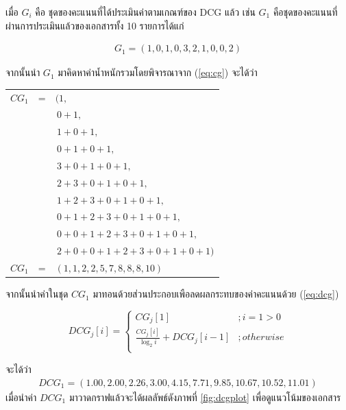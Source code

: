 \documentclass[11pt,a4paper]{article}
\begin{document}
{{{เมื่อ $G_i$ คือ ชุดของคะแนนที่ได้ประเมินค่าตามเกณฑ์ของ DCG แล้ว เช่น $G_1$ คือชุดของคะแนนที่ผ่านการประเมินแล้วของเอกสารทั้ง 10 รายการได้แก่ 

\begin{align*}
    G_1 = (1, 0, 1, 0, 3, 2, 1, 0, 0, 2)
\end{align*}

จากนั้นนำ $G_1$ มาคิดหาค่าน้ำหนักรวมโดยพิจารณาจาก (\ref{eq:cg}) จะได้ว่า

\begin{table}[ht!]
    \centering
    \begin{tabular}{rcl} 
        $CG_1$  &=&$(1,$                                      \\
                & &$\,0 + 1,$                                 \\
                & &$\,1 + 0 + 1,$                             \\
                & &$\,0 + 1 + 0 + 1,$                         \\
                & &$\,3 + 0 + 1 + 0 + 1,$                     \\
                & &$\,2 + 3 + 0 + 1 + 0 + 1,$                 \\
                & &$\,1 + 2 + 3 + 0 + 1 + 0 + 1,$             \\
                & &$\,0 + 1 + 2 + 3 + 0 + 1 + 0 + 1,$         \\
                & &$\,0 + 0 + 1 + 2 + 3 + 0 + 1 + 0 + 1,$     \\
                & &$\,2 + 0 + 0 + 1 + 2 + 3 + 0 + 1 + 0 + 1)$ \\
        $CG_1$  &=&$(1, 1, 2, 2, 5, 7, 8, 8, 8, 10)$
    \end{tabular}
\end{table}

จากนั้นนำค่าในชุด $CG_1$ มาทอนด้วยส่วนประกอบเพือลดผลกระทบของค่าคะแนนด้วย (\ref{eq:dcg})

\begin{equation}
    DCG_j[i] = 
    \begin{cases}
        CG_j[1]                                 &; i = 1 > 0 \\
        \frac{CG_j[i]}{\log_2i} + DCG_j[i-1]    &; otherwise \\
    \end{cases}
    \label{eq:dcg}
\end{equation}

จะได้ว่า
\begin{align*}
    DCG_1 = (1.00, 2.00, 2.26, 3.00, 4.15, 7.71, 9.85, 10.67, 10.52, 11.01)
\end{align*}
เมื่อนำค่า $DCG_1$ มาวาดกราฟแล้วจะได้ผลลัพธ์ดังภาพที่ \ref{fig:dcgplot} เพื่อดูแนวโน้มของเอกสาร

}}}
\end{document}
